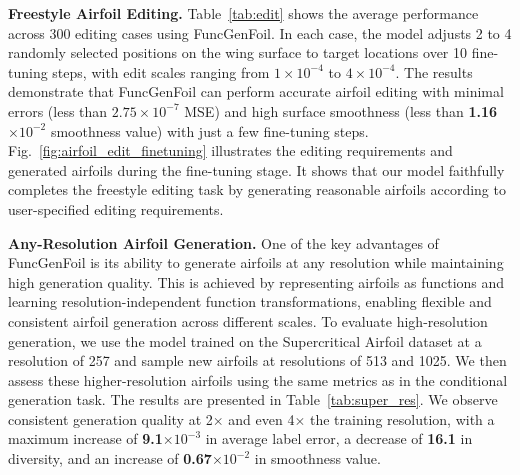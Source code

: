 \noindent\textbf{Freestyle Airfoil Editing.}
Table~\ref{tab:edit} shows the average performance across 300 editing cases using FuncGenFoil. In each case, the model adjusts 2 to 4 randomly selected positions on the wing surface to target locations over 10 fine-tuning steps, with edit scales ranging from $1 \times 10^{-4}$ to $4 \times 10^{-4}$. The results demonstrate that FuncGenFoil can perform accurate airfoil editing with minimal errors (less than \boldmath$2.75 \times 10^{-7}$ MSE) and high surface smoothness (less than \textbf{1.16} $\times 10^{-2}$ smoothness value) with just a few fine-tuning steps.
Fig.~\ref{fig:airfoil_edit_finetuning} illustrates the editing requirements and generated airfoils during the fine-tuning stage. It shows that our model faithfully completes the freestyle editing task by generating reasonable airfoils according to user-specified editing requirements.



\noindent\textbf{Any-Resolution Airfoil Generation.}
One of the key advantages of FuncGenFoil is its ability to generate airfoils at any resolution while maintaining high generation quality. This is achieved by representing airfoils as functions and learning resolution-independent function transformations, enabling flexible and consistent airfoil generation across different scales.
To evaluate high-resolution generation, we use the model trained on the Supercritical Airfoil dataset at a resolution of 257 and sample new airfoils at resolutions of 513 and 1025. We then assess these higher-resolution airfoils using the same metrics as in the conditional generation task. The results are presented in Table~\ref{tab:super_res}.
We observe consistent generation quality at 2$\times$ and even 4$\times$ the training resolution, with a maximum increase of \textbf{9.1$\times10^{-3}$} in average label error, a decrease of \textbf{16.1} in diversity, and an increase of \textbf{0.67$\times10^{-2}$} in smoothness value.

